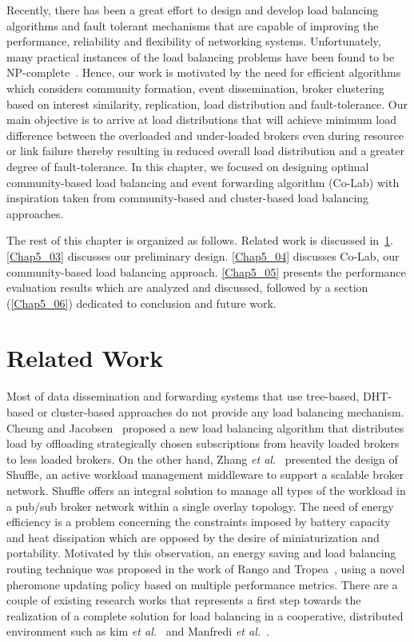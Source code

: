 Recently, there has been a great effort to design and develop load balancing algorithms and fault tolerant mechanisms that are capable of improving the performance, reliability and flexibility of networking systems. Unfortunately, many practical instances of the load balancing problems have been found to be NP-complete~\cite{XZhu2011}. Hence, our work is motivated by the need for efficient algorithms which considers community formation, event dissemination, broker clustering based on interest similarity, replication, load distribution and fault-tolerance. Our main objective is to arrive at load distributions that will achieve minimum load difference between the overloaded and under-loaded brokers even during resource or link failure thereby resulting in reduced overall load distribution and a greater degree of fault-tolerance. In this chapter, we focused on designing optimal community-based load balancing and event forwarding algorithm (Co-Lab) with inspiration taken from community-based and cluster-based load balancing approaches.

The rest of this chapter is organized as follows. Related work is discussed in~\ref{Chap5_02}. \ref{Chap5_03} discusses our preliminary design. \ref{Chap5_04} discusses Co-Lab, our community-based load balancing approach. \ref{Chap5_05} presents the performance evaluation results which are analyzed and discussed, followed by a section (\ref{Chap5_06}) dedicated to conclusion and future work.

\section{Related Work}\label{Chap5_02}
Most of data dissemination and forwarding systems that use tree-based, DHT-based or cluster-based approaches do not provide any load balancing mechanism. Cheung and Jacobsen~\cite{AKYCheung2010} proposed a new load balancing algorithm that distributes load by offloading strategically chosen subscriptions from heavily loaded brokers to less loaded brokers. On the other hand, Zhang {\it et al.}~\cite{HZhang2008} presented the design of Shuffle, an active workload management middleware to support a scalable broker network. Shuffle offers an integral solution to manage all types of the workload in a pub/sub broker network within a single overlay topology. The need of energy efficiency is a problem concerning the constraints imposed by battery capacity and heat dissipation which are opposed by the desire of miniaturization and portability. Motivated by this observation, an energy saving and load balancing routing technique was proposed in the work of Rango and Tropea~\cite{FDeRango2009}, using a novel pheromone updating policy based on multiple performance metrics. There are a couple of existing research works that represents a first step towards the realization of a complete solution for load balancing in a cooperative, distributed environment such as kim {\it et al.}~\cite{SManfredi2013} and Manfredi {\it et al.}~\cite{HKim2012}.

